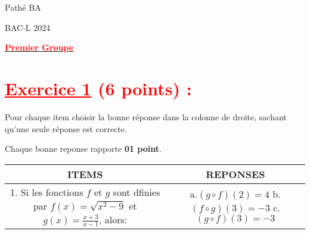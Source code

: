 \documentclass[12pt]{article}
\begin{document}
\begin{minipage}{0.8\textwidth}
	Pathé BA                          
\end{minipage}
\begin{minipage}{0.8\textwidth}
	BAC-L 2024
\end{minipage}

\begin{center}
\textbf{{\underline{\textcolor{red}{Premier Groupe}}}}
\end{center}

\section*{\textcolor{red}{\underline{Exercice 1} (6 points) :}}
Pour chaque item choisir la bonne réponse dans la colonne de droite, sachant qu'une seule réponse est correcte.

Chaque bonne reponse rapporte \textbf{ 01 point}.

\begin{tabular}{|c|c|}
\hline
\textbf{ITEMS}  & \textbf{REPONSES}\\
\hline
1. Si les fonctions $f$ et $g$ sont dfinies par $f(x)=\sqrt{x^{2}-9}$ et $g(x)=\frac{x+3}{x-1}$, alors: &
\makecell{a.$(g\circ f)(2)=4$\\ b.$(f\circ g)(3)=-3$\\c.$(g\circ f)(3)=-3$}\\
\hline
\end{tabular}
\end{document}
